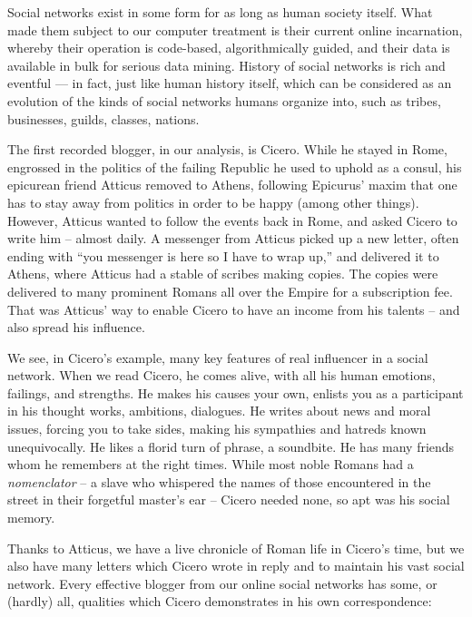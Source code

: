 \documentclass[10pt,oneside]{memoir}
\begin{document}
Social networks exist in some form for as long as human society itself.  What made them subject to our computer treatment is their current online incarnation, whereby their operation is code-based, algorithmically guided, and their data is available in bulk for serious data mining.
History of social networks is rich and eventful --- in fact, just like human history itself, which can be considered as an evolution of the kinds of social networks humans organize into, such as tribes, businesses, guilds, classes, nations.


The first recorded blogger, in our analysis, is Cicero.  While he stayed in Rome, engrossed in the politics of the failing Republic he used to uphold as a consul, his epicurean friend Atticus removed to Athens, following Epicurus' maxim that one has to stay away from politics in order to be happy (among other things).  However, Atticus wanted to follow the events back in Rome, and asked Cicero to write him -- almost daily.  A messenger from Atticus picked up a new letter, often ending with ``you messenger is here so I have to wrap up,'' and delivered it to Athens, where Atticus had a stable of scribes making copies.  The copies were delivered to many prominent Romans all over the Empire for a subscription fee.  That was Atticus' way to enable Cicero to have an income from his talents -- and also spread his influence.


We see, in Cicero's example, many key features of real influencer in a social network.  When we read Cicero, he comes alive, with all his human emotions, failings, and strengths.  He makes his causes your own, enlists you as a participant in his thought works, ambitions, dialogues.  He writes about news and moral issues, forcing you to take sides, making his sympathies and hatreds known unequivocally.  He likes a florid turn of phrase, a soundbite.  He has many friends whom he remembers at the right times.  While most noble Romans had a {\itshape nomenclator} -- a slave who whispered the names of those encountered in the street in their forgetful master's ear -- Cicero needed none, so apt was his social memory.


Thanks to Atticus, we have a live chronicle of Roman life in Cicero's time, but we also have many letters which Cicero wrote in reply and to maintain his vast social network. Every effective blogger from our online social networks has some, or (hardly) all, qualities which Cicero demonstrates in his own correspondence:
\end{document}
